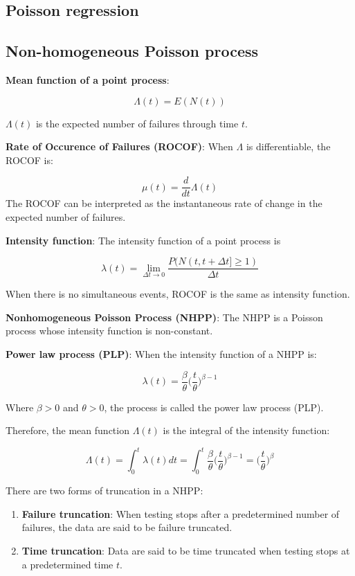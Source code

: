 \documentclass[12pt]{book}
\numberwithin{equation}{chapter}
\providecommand{\tightlist}{%
  \setlength{\itemsep}{0pt}\setlength{\parskip}{0pt}}
\begin{document}
\hypertarget{poisson-regression}{%
\subsection{Poisson regression}\label{poisson-regression}}

\hypertarget{non-homogeneous-poisson-process}{%
\subsection{Non-homogeneous Poisson process}\label{non-homogeneous-poisson-process}}

\textbf{Mean function of a point process}:

\[\Lambda(t) = E(N(t))\]

\(\Lambda(t)\) is the expected number of failures through time \(t\).

\textbf{Rate of Occurence of Failures (ROCOF)}: When \(\Lambda\) is differentiable, the ROCOF is:

\[\mu(t) = \frac{d}{dt}\Lambda(t)\]
The ROCOF can be interpreted as the instantaneous rate of change in the expected number of failures.

\textbf{Intensity function}: The intensity function of a point process is

\[\lambda(t) = \lim_{\Delta t \rightarrow 0}\frac{P(N(t, t+\Delta t] \geq 1)}{\Delta t}\]

When there is no simultaneous events, ROCOF is the same as intensity function.

\textbf{Nonhomogeneous Poisson Process (NHPP)}: The NHPP is a Poisson process whose intensity function is non-constant.

\textbf{Power law process (PLP)}: When the intensity function of a NHPP is:

\[\lambda(t) = \frac{\beta}{\theta}\bigg(\frac{t}{\theta}\bigg)^{\beta-1}\]

Where \(\beta > 0\) and \(\theta > 0\), the process is called the power law process (PLP).

Therefore, the mean function \(\Lambda(t)\) is the integral of the intensity function:

\[\Lambda(t) = \int_0^t \lambda(t)dt = \int_0^t \frac{\beta}{\theta}\bigg(\frac{t}{\theta}\bigg)^{\beta-1} = \bigg(\frac{t}{\theta}\bigg)^{\beta}\]

There are two forms of truncation in a NHPP:

\begin{enumerate}
\def\labelenumi{\arabic{enumi}.}
\tightlist
\item
  \textbf{Failure truncation}: When testing stops after a predetermined number of failures, the data are said to be failure truncated.
\item
  \textbf{Time truncation}: Data are said to be time truncated when testing stops at a predetermined time \(t\).
\end{enumerate}
\end{document}
